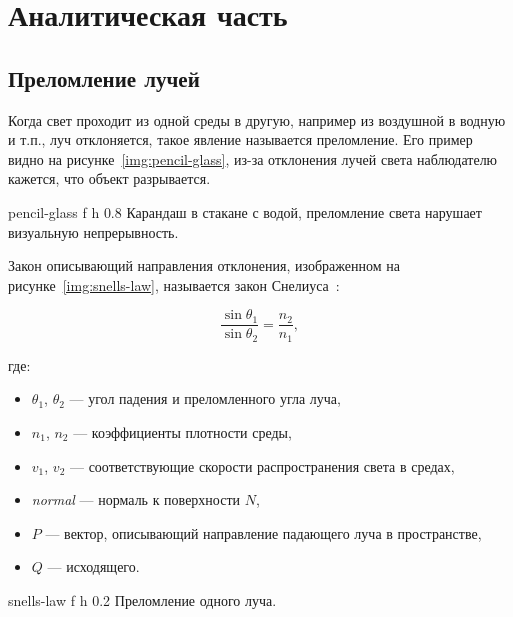 \chapter{Аналитическая часть}
\section{Преломление лучей}

Когда свет проходит из одной среды в другую, например из воздушной в водную и т.п., луч отклоняется, такое явление называется преломление. Его пример видно на рисунке~\ref{img:pencil-glass}, из-за отклонения лучей света наблюдателю кажется, что объект разрывается.

{pencil-glass} %
{f} %
{h} %
{0.8\textwidth} %
{Карандаш в стакане с водой, преломление света нарушает визуальную непрерывность.} %

Закон описывающий направления отклонения, изображенном на  рисунке~\ref{img:snells-law}, называется закон Снелиуса~\cite{rogers-book}:

\begin{equation}
	\frac{\sin\theta_1}{\sin\theta_2} = \frac{n_2}{n_1},
\end{equation}

где:

\begin{itemize}
	\item \(\theta_1\), \(\theta_2\) --- угол падения и преломленного угла луча,
	\item \(n_1\), $n_2$ --- коэффициенты плотности среды,
	\item \(v_1\), $v_2$ --- соответствующие скорости распространения света в средах,
	\item \textit{normal} --- нормаль к поверхности \(N\),
	\item $P$ --- вектор, описывающий направление падающего луча в пространстве,
	\item $Q$ --- исходящего.
\end{itemize}

{snells-law} %
{f} %
{h} %
{0.2\textwidth} %
{Преломление одного луча.} %

